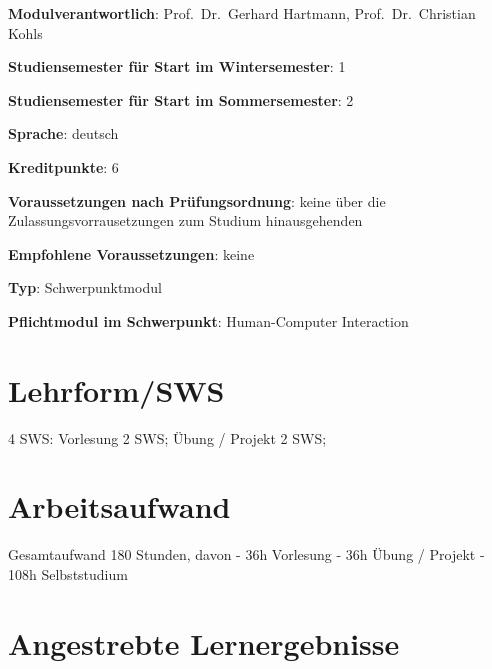 \begin{modulHead}
\textbf{Modulverantwortlich}: Prof.~Dr.~Gerhard
Hartmann, Prof.~Dr.~Christian
Kohls
\end{modulHead}
\begin{modulHead}
\textbf{Studiensemester für
Start im Wintersemester}:
1
\end{modulHead}
\begin{modulHead}
\textbf{Studiensemester für Start
im Sommersemester}:
2
\end{modulHead}
\begin{modulHead}
\textbf{Sprache}:
deutsch
\end{modulHead}
\begin{modulHead}
\textbf{Kreditpunkte}:
6
\end{modulHead}
\begin{modulHead}
\textbf{Voraussetzungen nach
Prüfungsordnung}: keine über die Zulassungsvorrausetzungen zum Studium
hinausgehenden
\end{modulHead}
\begin{modulHead}
\textbf{Empfohlene
Voraussetzungen}: keine
\end{modulHead}
\begin{modulHead}
\textbf{Typ}:
Schwerpunktmodul
\end{modulHead}
\begin{modulHead}
\textbf{Pflichtmodul
im Schwerpunkt}: Human-Computer Interaction
\end{modulHead}


\section*{Lehrform/SWS\label{/mi-2017/modulbeschreibungen-master/MA_HCI_Design_Methodologies}}\label{lehrformswspathlabelmi-2017modulbeschreibungen-mastermaux5fhciux5fdesignux5fmethodologies}

4 SWS: Vorlesung 2 SWS; Übung / Projekt 2 SWS;

\section*{Arbeitsaufwand\label{/mi-2017/modulbeschreibungen-master/MA_HCI_Design_Methodologies}}\label{arbeitsaufwandpathlabelmi-2017modulbeschreibungen-mastermaux5fhciux5fdesignux5fmethodologies}

Gesamtaufwand 180 Stunden, davon - 36h Vorlesung - 36h Übung / Projekt -
108h Selbststudium

\section*{Angestrebte
Lernergebnisse\label{/mi-2017/modulbeschreibungen-master/MA_HCI_Design_Methodologies}}\label{angestrebte-lernergebnissepathlabelmi-2017modulbeschreibungen-mastermaux5fhciux5fdesignux5fmethodologies}

